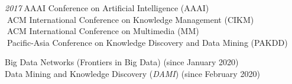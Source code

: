 \documentclass[10pt]{article}
\newenvironment{myindentpar}[1]%
{\begin{list}{}%
         {\setlength{\leftmargin}{#1}}%
         \item[]%
}
{\end{list}}
\newcounter{list}
\begin{document}
\begin{myindentpar}{0.75cm}
{\hspace{-0.75cm}\emph{2017}\textcolor{white}{.}AAAI Conference on Artificial Intelligence (AAAI) \\
\textcolor{white}{.}ACM International Conference on Knowledge Management (CIKM) \\
\textcolor{white}{.}ACM International Conference on Multimedia (MM) \\
\textcolor{white}{.}Pacific-Asia Conference on Knowledge Discovery and Data Mining (PAKDD)

}

\hspace{-0.75cm}{\bf Associate Editor}

{\small

Big Data Networks (Frontiers in Big Data) (since January 2020) \\
Data Mining and Knowledge Discovery (\textit{DAMI}) (since February 2020)

}

\hspace{-0.75cm}{\bf Journal Reviewer}

{\small

}
\end{myindentpar}
\end{document}

